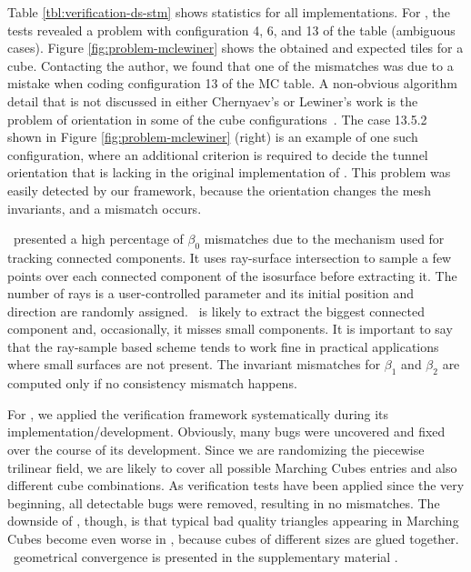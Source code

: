

Table \ref{tbl:verification-ds-stm} shows statistics for all 
implementations. For 
\mclewiner, the tests revealed a problem with configuration 4, 6, and 13 of
the table (ambiguous cases). Figure \ref{fig:problem-mclewiner} shows the
obtained and expected tiles for a cube. 
Contacting the author,
we found that one of the mismatches was due
to a mistake when coding configuration 13 of the MC table. A
non-obvious algorithm detail that is not
discussed in either Chernyaev's or Lewiner's work is the problem of orientation in
some of the cube configurations~\cite{Lewiner:2010:PC}. The case 13.5.2 shown in Figure
\ref{fig:problem-mclewiner} (right) is an example of one such configuration, where
an additional criterion is required to decide the tunnel orientation that is
lacking in the original implementation of \mclewiner. This problem was easily
detected by our framework, because the orientation changes the mesh
invariants, and a mismatch occurs.

\deliso\ presented a high percentage of $\beta_0$ mismatches due to the
mechanism used for tracking connected components. It uses ray-surface intersection to
sample a few points over each connected component of the isosurface before extracting it.
The number of rays is a user-controlled parameter and its initial position
and direction are randomly assigned. \deliso\ is likely to extract the biggest
connected component and, occasionally, it misses small components. It is
important to say that
the ray-sample based scheme tends to work fine in practical applications where
small
surfaces are not present. The invariant mismatches for $\beta_1$ and $\beta_2$
are computed only
if no consistency mismatch happens.

For \mcsimpleflow, we applied the verification
framework systematically during its implementation/development. Obviously, many
bugs were uncovered and fixed over the course of its development. 
Since we are randomizing the piecewise trilinear field, we are
likely to cover all possible Marching Cubes entries and also different
cube combinations. As verification tests have been applied since the very beginning,
all detectable bugs were removed, resulting in no mismatches. 
The downside of \mcsimpleflow, though, is that typical bad quality
triangles appearing in Marching Cubes become even worse in
\mcsimpleflow,
because cubes of different sizes are glued together. 
\mcsimpleflow\ geometrical
convergence is presented in the supplementary material
\cite{scheidegger:techreport:2010}.

